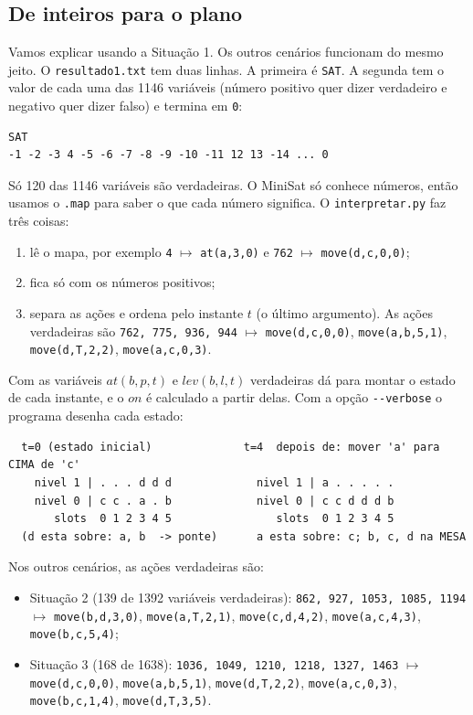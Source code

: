 \documentclass[11pt,a4paper]{article}
\newcommand{\at}{\mathit{at}}
\newcommand{\lev}{\mathit{lev}}
\newcommand{\on}{\mathit{on}}
\begin{document}
\subsection{De inteiros para o plano}
Vamos explicar usando a Situação 1. Os outros cenários funcionam do mesmo jeito.
O \texttt{resultado1.txt} tem duas linhas. A primeira é \texttt{SAT}. A segunda tem
o valor de cada uma das 1146 variáveis (número positivo quer dizer verdadeiro e
negativo quer dizer falso) e termina em \texttt{0}:
\begin{lstlisting}
SAT
-1 -2 -3 4 -5 -6 -7 -8 -9 -10 -11 12 13 -14 ... 0
\end{lstlisting}
Só 120 das 1146 variáveis são verdadeiras. O MiniSat só conhece números, então
usamos o \texttt{.map} para saber o que cada número significa. O
\texttt{interpretar.py} faz três coisas:
\begin{enumerate}
  \item lê o mapa, por exemplo \texttt{4} $\mapsto$ \texttt{at(a,3,0)} e
        \texttt{762} $\mapsto$ \texttt{move(d,c,0,0)};
  \item fica só com os números positivos;
  \item separa as ações e ordena pelo instante $t$ (o último argumento). As ações
        verdadeiras são \texttt{762, 775, 936, 944} $\mapsto$
        \texttt{move(d,c,0,0)}, \texttt{move(a,b,5,1)}, \texttt{move(d,T,2,2)},
        \texttt{move(a,c,0,3)}.
\end{enumerate}
Com as variáveis $\at(b,p,t)$ e $\lev(b,l,t)$ verdadeiras dá para montar o estado de
cada instante, e o $\on$ é calculado a partir delas. Com a opção
\texttt{-{}-verbose} o programa desenha cada estado:
\begin{lstlisting}
  t=0 (estado inicial)              t=4  depois de: mover 'a' para CIMA de 'c'
    nivel 1 | . . . d d d             nivel 1 | a . . . . .
    nivel 0 | c c . a . b             nivel 0 | c c d d d b
       slots  0 1 2 3 4 5                slots  0 1 2 3 4 5
  (d esta sobre: a, b  -> ponte)      a esta sobre: c; b, c, d na MESA
\end{lstlisting}

Nos outros cenários, as ações verdadeiras são:
\begin{itemize}
  \item Situação 2 (139 de 1392 variáveis verdadeiras): \texttt{862, 927, 1053, 1085, 1194}
        $\mapsto$ \texttt{move(b,d,3,0)}, \texttt{move(a,T,2,1)}, \texttt{move(c,d,4,2)},
        \texttt{move(a,c,4,3)}, \texttt{move(b,c,5,4)};
  \item Situação 3 (168 de 1638): \texttt{1036, 1049, 1210, 1218, 1327, 1463}
        $\mapsto$ \texttt{move(d,c,0,0)}, \texttt{move(a,b,5,1)}, \texttt{move(d,T,2,2)},
        \texttt{move(a,c,0,3)}, \texttt{move(b,c,1,4)}, \texttt{move(d,T,3,5)}.
\end{itemize}
\end{document}

